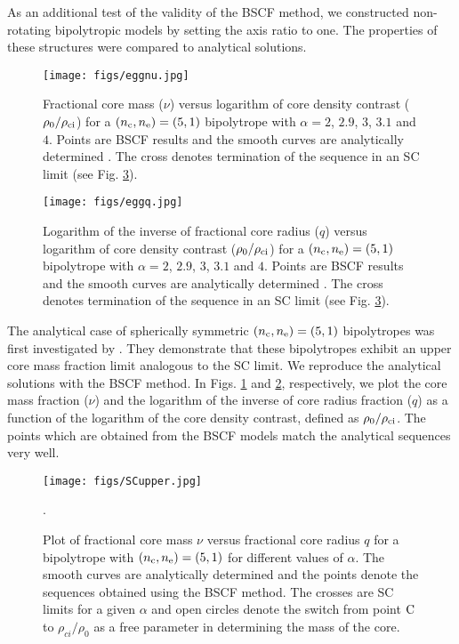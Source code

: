 \documentclass[a4paper,fleqn,usenatbib]{mnras}
\begin{document}
As an additional test of the validity of the BSCF method, we constructed non-rotating bipolytropic models by setting the axis ratio to one. The properties of these structures were compared to analytical solutions.

\begin{figure} 
\centering
\texttt{[image: figs/eggnu.jpg]}
\caption{Fractional core mass ($\nu$) versus logarithm of core density contrast ($\rho_{\rm 0}/ \rho_{\rm ci}$) for a $(n_{\rm c},n_{\rm e})=(5,1)$ bipolytrope with $\alpha=2$, $2.9$, $3$, $3.1$ and $4$. Points are BSCF results and the smooth curves are analytically determined \citep{Eggleton1998}. The cross denotes termination of the sequence in an SC limit (see Fig. \ref{fig:nuq}).}
\label{fig:egg_nu}
\end{figure}

\begin{figure} 
\centering
\texttt{[image: figs/eggq.jpg]}
\caption{
Logarithm of the inverse of fractional core radius ($q$) versus logarithm of core density contrast ($\rho_{\rm 0}/ \rho_{\rm ci}$) for a $(n_{\rm c},n_{\rm e})=(5,1)$ bipolytrope with $\alpha=2$, $2.9$, $3$, $3.1$ and $4$. Points are BSCF results and the smooth curves are analytically determined \citep{Eggleton1998}. 
The cross denotes termination of the sequence in an SC limit (see Fig. \ref{fig:nuq}).  
}
\label{fig:egg_q}
\end{figure}

The analytical case of spherically symmetric $(n_{\rm c},n_{\rm e})=(5,1)$ bipolytropes was first investigated by \cite{Eggleton1998}. They demonstrate that these bipolytropes exhibit an upper core mass fraction limit analogous to the SC
limit. We reproduce the analytical solutions with the BSCF method.  
In Figs. \ref{fig:egg_nu} and \ref{fig:egg_q}, respectively, we plot the core mass fraction ($\nu$) and  the logarithm of the inverse of core radius fraction ($q$) as a function of  the logarithm of the core density contrast, defined as $\rho_{\rm 0}/ \rho_{\rm ci}$. 
The points which are obtained from the BSCF models match the analytical sequences very well.


\begin{figure} 
\centering
\texttt{[image: figs/SCupper.jpg]}
\caption{Plot of fractional core mass $\nu$ versus fractional core radius $q$ for a bipolytrope with $(n_{\rm c},n_{\rm e})=(5,1)$ for different values of $\alpha$. 
The smooth curves are analytically determined and 
the points denote the sequences obtained using the BSCF method. The crosses are SC limits for a given $\alpha$ and open circles denote the switch from point $\rm C$ to $\rho_{ci}/ \rho_0$ as a free parameter in determining the mass of the core.}.
\label{fig:nuq}
\end{figure}
\end{document}
